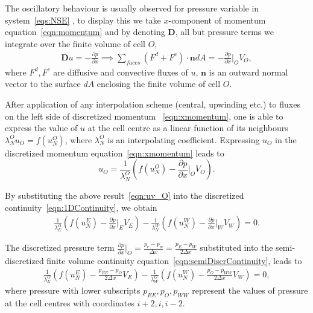 \documentclass{article}
\begin{document}
The oscillatory behaviour is usually observed for pressure variable in system~\eqref{eqs:NSE} \cite{Zikanov:2010}, to display this we take $x$-component of momentum equation~\eqref{eqn:momentum} and by denoting $\boldsymbol{D}$, all but pressure terms we integrate over the finite volume of cell $O$,
 \begin{equation}\label{eqn:xmomentum}
 	\begin{aligned}
 		 	\boldsymbol{D}u = -\frac{\partial p}{\partial x} \implies\sum_{faces}(F^d+F^c)\cdot \boldsymbol{n} dA = -\frac{\partial p}{\partial x}\bigg|_{O}V_O,
 	\end{aligned}
 \end{equation}
 where $F^d,F^c$ are diffusive and convective fluxes of $u$, $\boldsymbol{n}$ is an outward normal vector to the surface $dA$ enclosing the finite volume of cell $O$.
 
 After application of any interpolation scheme (central, upwinding etc.) to fluxes on the left side of discretized momentum ~\eqref{eqn:xmomentum}, one is able to express the value of ${u}$ at the cell centre as a linear function of its neighbours $\lambda_N^O{u}_O=f(u^O_N)$, where $\lambda_N^O$  is an interpolating coefficient. Expressing $u_O$ in the discretized momentum equation~\eqref{eqn:xmomentum} leads to
\begin{equation}\label{eqn:uv_O}
	u_O=\frac{1}{\lambda_N^O}\left(f(u^O_N)-\frac{\partial p}{\partial x}\bigg|_O V_O\right).
\end{equation}

By substituting the above result~\eqref{eqn:uv_O} into the discretized continuity~\eqref{eqn:1DContinuity}, we obtain
\begin{equation}\label{eqn:semiDiscrContinuity}
\begin{aligned}
	\frac{1}{\lambda_E^O}\left(f(u^E_N)-\frac{\partial p}{\partial x}\bigg|_E V_E\right)-\frac{1}{\lambda_N^W}\left(f(u^W_N)-\frac{\partial p}{\partial x}\bigg|_W V_W\right)=0.
\end{aligned}
\end{equation}

The discretized pressure term $\frac{\partial p}{\partial x}\big|_O=\frac{p_e-p_w}{\Delta x}=\frac{p_E-p_W}{2\Delta x}$ substituted into the semi-discretized finite volume continuity equation~\eqref{eqn:semiDiscrContinuity}, leads to
\begin{equation}\label{eqn:FVMcontinuity}
\begin{aligned}
	\frac{1}{\lambda_E^O}\left(f(u^E_N)-\frac{p_{EE}-p_O}{2\Delta x} V_E\right)-\frac{1}{\lambda_W^O}\left(f(u^W_N)-\frac{p_O-p_{WW}}{2\Delta x} V_W\right)=0,
\end{aligned}
\end{equation}
where pressure with lower subscripts $p_{EE},p_{O}, p_{WW}$ represent the values of pressure at the cell centres with coordinates $i+2,i, i-2$.
\end{document}
